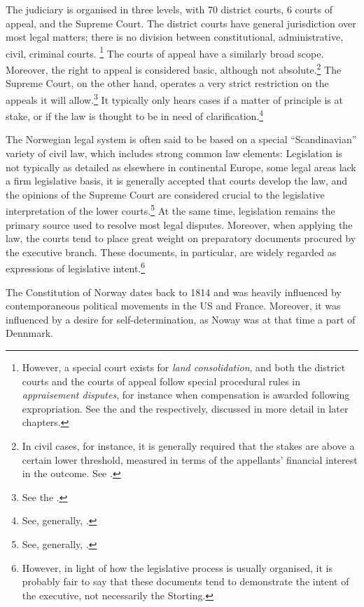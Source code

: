 The judiciary is organised in three levels, with 70 district courts, 6 courts of appeal, and the Supreme Court. The district courts have general jurisdiction over most legal matters; there is no division between constitutional, administrative, civil, criminal courts. \footnote{However, a special court exists for {\it land consolidation}, and both the district courts and the courts of appeal follow special procedural rules in {\it appraisement disputes}, for instance when compensation is awarded following expropriation. See the \cite{lca79} and the \cite{aa17} respectively, discussed in more detail in later chapters.} The courts of appeal have a similarly broad scope. Moreover, the right to appeal is considered basic, although not absolute.\footnote{In civil cases, for instance, it is generally required that the stakes are above a certain lower threshold, measured in terms of the appellants' financial interest in the outcome. See \cite[29-13]{da05}.} The Supreme Court, on the other hand, operates a very strict restriction on the appeals it will allow.\footnote{See the \cite[30-4]{da05}.} It typically only hears cases if a matter of principle is at stake, or if the law is thought to be in need of clarification.\footnote{See, generally, \cite{skoghoy08}.}

The Norwegian legal system is often said to be based on a special ``Scandinavian'' variety of civil law, which includes strong common law elements: Legislation is not typically as detailed as elsewhere in continental Europe, some legal areas lack a firm legislative basis, it is generally accepted that courts develop the law, and the opinions of the Supreme Court are considered crucial to the legislative interpretation of the lower courts.\footnote{See, generally, \cite{bernitz07}.} At the same time, legislation remains the primary source used to resolve most legal disputes. Moreover, when applying the law, the courts tend to place great weight on preparatory documents procured by the executive branch. These documents, in particular, are widely regarded as expressions of legislative intent.\footnote{However, in light of how the legislative process is usually organised, it is probably fair to say that these documents tend to demonstrate the intent of the executive, not necessarily the Storting.}

The Constitution of Norway dates back to 1814 and was heavily influenced by contemporaneous political movements in the US and France. Moreover, it was influenced by a desire for self-determination, as Noway was at that time a part of Dennmark. 

